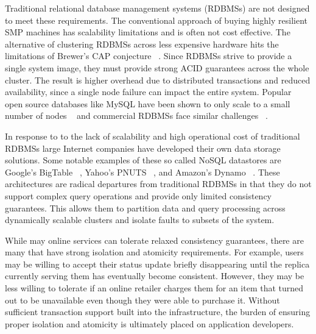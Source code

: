 \documentclass[10pt,final,journal]{IEEEtran}
\begin{document}
Traditional relational database management systems (RDBMSs) are not designed to meet these requirements. The conventional approach of buying highly resilient SMP machines has scalability limitations and is often not cost effective. The alternative of clustering RDBMSs across less expensive hardware hits the limitations of Brewer's CAP conjecture ~\cite{}. Since RDBMSs strive to provide a single system image, they must provide strong ACID guarantees across the whole cluster. The result is higher overhead due to distributed transactions and reduced availability, since a single node failure can impact the entire system. Popular open source databases like MySQL have been shown to only scale to a small number of nodes ~\cite{Malkowski:2010:EAD:1774088.1774449} and commercial RDBMSs face similar challenges ~\cite{Campbell:2010:ESF:1807167.1807280}.

In response to to the lack of scalability and high operational cost of traditional RDBMSs large Internet companies have developed their own data storage solutions. Some notable examples of these so called NoSQL datastores are Google's BigTable ~\cite{Chang:2006:BDS:1267308.1267323}, Yahoo's PNUTS ~\cite{Cooper:2008:PYH:1454159.1454167}, and Amazon's Dynamo ~\cite{DeCandia:2007:DAH:1323293.1294281}. These architectures are radical departures from traditional RDBMSs in that they do not support complex query operations and provide only limited consistency guarantees. This allows them to partition data and query processing across dynamically scalable clusters and isolate faults to subsets of the system.

While may online services can tolerate relaxed consistency guarantees, there are many that have strong isolation and atomicity requirements. For example, users may be willing to accept their status update briefly disappearing until the replica currently serving them has eventually become consistent. However, they may be less willing to tolerate if an online retailer charges them for an item that turned out to be unavailable even though they were able to purchase it. Without sufficient transaction support built into the infrastructure, the burden of ensuring proper isolation and atomicity is ultimately placed on application developers.
\end{document}
